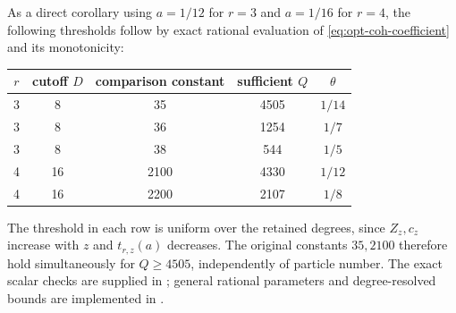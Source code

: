 As a direct corollary using $a=1/12$ for $r=3$ and $a=1/16$ for $r=4$,
the following thresholds follow by exact rational evaluation of
\eqref{eq:opt-coh-coefficient} and its monotonicity:
\begin{center}
\begin{tabular}{ccccc}
\toprule
$r$ & cutoff $D$ & comparison constant & sufficient $Q$ & $\theta$\\
\midrule
3&8&35&4505&$1/14$\\
3&8&36&1254&$1/7$\\
3&8&38&544&$1/5$\\
4&16&2100&4330&$1/12$\\
4&16&2200&2107&$1/8$\\
\bottomrule
\end{tabular}
\end{center}
The threshold in each row is uniform over the retained degrees, since
$Z_z,c_z$ increase with $z$ and $t_{r,z}(a)$ decreases.
The original constants $35,2100$ therefore hold simultaneously for
$Q\ge4505$, independently of particle number.
The exact scalar checks are supplied in
; general rational parameters and
degree-resolved bounds are implemented in
.

